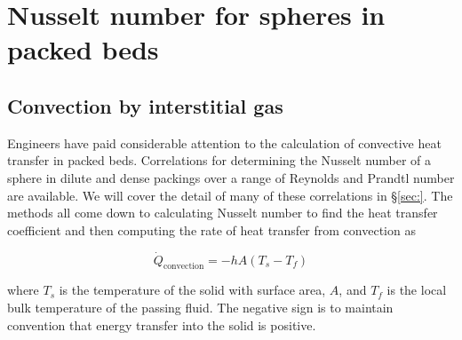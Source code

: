 \section{Nusselt number for spheres in packed beds}\label{sec:particle-convection}
\subsection{Convection by interstitial gas}

Engineers have paid considerable attention to the calculation of convective heat transfer in packed beds. Correlations for determining the Nusselt number of a sphere in dilute and dense packings over a range of Reynolds and Prandtl number are available. We will cover the detail of many of these correlations in \S\ref{sec:}. The methods all come down to calculating Nusselt number to find the heat transfer coefficient and then computing the rate of heat transfer from convection as

\begin{equation}
	\dot{Q}_\text{convection} = -hA(T_s-T_f)
\end{equation}

where $T_s$ is the temperature of the solid with surface area, $A$, and $T_f$ is the local bulk temperature of the passing fluid. The negative sign is to maintain convention that energy transfer into the solid is positive.
